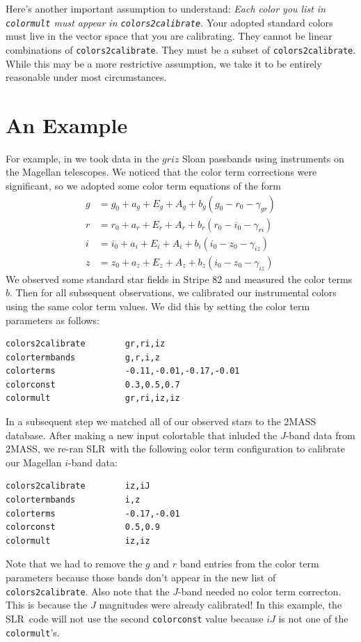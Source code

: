 \documentclass{report}
\newcommand{\slr}{SLR}
\begin{document}
Here's another important assumption to understand: {\it Each color you
  list in \verb|colormult| must appear in \verb|colors2calibrate|.}
Your adopted standard colors must live in the vector space that you
are calibrating.  They cannot be linear combinations of
\verb|colors2calibrate|.  They must be a subset of
\verb|colors2calibrate|.  While this may be a more restrictive
assumption, we take it to be entirely reasonable under most
circumstances.



\section{An Example}

For example, in \citet{bib:slr} we took data in the $griz$ Sloan
passbands using instruments on the Magellan telescopes.  We noticed
that the color term corrections were significant, so we adopted some
color term equations of the form
\begin{subequations} 
\begin{align}
  g & = g_0 + a_g + E_g + A_g + b_g(g_0-r_0 - \gamma_{gr}) \\
  r & = r_0 + a_r + E_r + A_r + b_r(r_0-i_0 - \gamma_{ri}) \\
  i & = i_0 + a_i + E_i + A_i + b_i(i_0-z_0 - \gamma_{iz}) \\
  z & = z_0 + a_z + E_z + A_z + b_z(i_0-z_0 - \gamma_{iz})
\end{align} 
\end{subequations}
We observed some standard star fields in Stripe 82 and measured the
color terms $b$.  Then for all subsequent observations, we calibrated
our instrumental colors using the same color term values.  We did this
by setting the color term parameters as follows:
\begin{verbatim}
colors2calibrate        gr,ri,iz
colortermbands          g,r,i,z
colorterms              -0.11,-0.01,-0.17,-0.01
colorconst              0.3,0.5,0.7
colormult               gr,ri,iz,iz
\end{verbatim}

In a subsequent step we matched all of our observed stars to the 2MASS
database.  After making a new input colortable that inluded the
$J$-band data from 2MASS, we re-ran \slr\ with the following color
term configuration to calibrate our Magellan $i$-band data:
\begin{verbatim}
colors2calibrate        iz,iJ
colortermbands          i,z
colorterms              -0.17,-0.01 
colorconst              0.5,0.9 
colormult               iz,iz
\end{verbatim}
Note that we had to remove the $g$ and $r$ band entries from the color
term parameters because those bands don't appear in the new list of
\verb|colors2calibrate|.  Also note that the $J$-band needed no color
term correcton.  This is because the $J$ magnitudes were already
calibrated!  In this example, the \slr\ code will not use the second
\verb|colorconst| value because $iJ$ is not one of the
\verb|colormult|'s.
\end{document}
